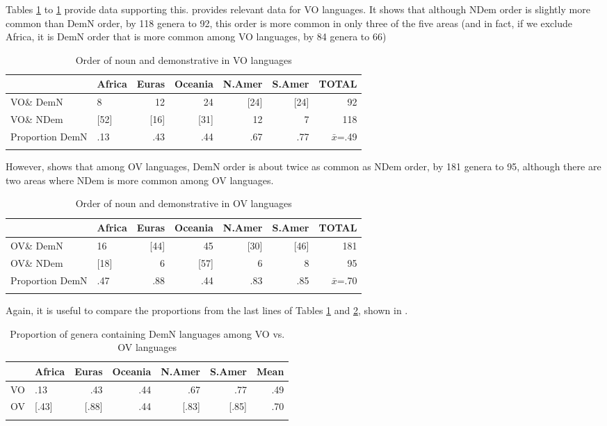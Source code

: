 \documentclass[output=paper]{langsci/langscibook}
\begin{document}
Tables \ref{tab:dryer:11} to \ref{tab:dryer:11} provide data supporting this.  provides relevant data for VO languages. It shows that although NDem order is slightly more common than DemN order, by 118 genera to 92, this order is more common in only three of the five areas (and in fact, if we exclude Africa, it is DemN order that is more common among VO languages, by 84 genera to 66)

\begin{table}
\begin{tabularx}{\textwidth}{llrrrrr} 
\lsptoprule
& \bfseries Africa & \bfseries Euras & \bfseries Oceania & \bfseries N.Amer & \bfseries S.Amer & \bfseries TOTAL\\
\midrule 
VO\& DemN & 8 & 12 & 24 & [24] & [24] & 92\\
VO\& NDem & [52] & [16] & [31] & 12 & 7 & 118\\
Proportion DemN & .13 & .43 & .44 & .67 & .77 & $\bar{x}$=.49\\
\lspbottomrule
\end{tabularx}
\caption{\label{tab:dryer:11}Order of noun and demonstrative in VO languages}
\end{table}


However,  shows that among OV languages, DemN order is about twice as common as NDem order, by 181 genera to 95, although there are two areas where NDem is more common among OV languages.

\begin{table}
\begin{tabularx}{\textwidth}{llrrrrr}
\lsptoprule
& \bfseries Africa & \bfseries Euras & \bfseries Oceania & \bfseries N.Amer & \bfseries S.Amer & \bfseries TOTAL\\
\midrule
OV\& DemN & 16 & [44] & 45 & [30] & [46] & 181\\
OV\& NDem & [18] & 6 & [57] & 6 & 8 & 95\\
Proportion DemN & .47 & .88 & .44 & .83 & .85 & $\bar{x}$=.70\\
\lspbottomrule
\end{tabularx}
\caption{\label{tab:dryer:12}Order of noun and demonstrative in OV languages}
\end{table}

Again, it is useful to compare the proportions from the last lines of Tables \ref{tab:dryer:11} and \ref{tab:dryer:12}, shown in .

\begin{table}
\begin{tabularx}{\textwidth}{Xlrrrrr}
\lsptoprule
& \bfseries Africa & \bfseries Euras & \bfseries Oceania & \bfseries N.Amer & \bfseries S.Amer & \bfseries Mean\\
\midrule
VO & .13 & .43 & .44 & .67 & .77 & .49\\
OV & [.43] & [.88] & .44 & [.83] & [.85] & .70\\
\lspbottomrule
\end{tabularx}
\caption{\label{tab:dryer:13}Proportion of genera containing DemN languages among VO vs. OV languages} 
\end{table}
\end{document}
